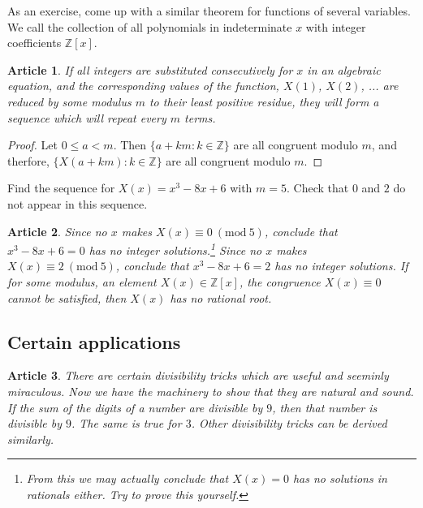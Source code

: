 \documentclass{article}
\theoremstyle{problemstyle}
\newtheorem{article}{Article}
\newcommand{\Mod}[1]{\ (\mathrm{mod}\ #1)}
\begin{document}
As an exercise, come up with a similar theorem for functions of several variables. \\

We call the collection of all polynomials in indeterminate $x$ with integer coefficients $\mathbb{Z}[x]$. 

\begin{article}
If all integers are substituted consecutively for $x$ in an algebraic equation, and the corresponding values of the function, $X(1)$, $X(2)$, ... are reduced by some modulus $m$ to their least positive residue, they will form a sequence which will repeat every $m$ terms.  
\end{article}

\begin{proof}
Let $0 \leq a < m$. Then $\{a+km:k \in \mathbb{Z}\}$ are all congruent modulo $m$, and therfore, $\{X(a+km):k \in \mathbb{Z}\}$ are all congruent modulo $m$. 
\end{proof}

Find the sequence for $X(x) = x^3 - 8x + 6$ with $m = 5$. Check that $0$ and $2$ do not appear in this sequence. 

\begin{article}
Since no $x$ makes $X(x) \equiv 0\Mod{5}$, conclude that $x^3 - 8x + 6 = 0$ has no integer solutions.\footnote{From this we may actually conclude that $X(x) = 0$ has no solutions in rationals either. Try to prove this yourself. }   Since no $x$ makes $X(x) \equiv 2\Mod{5}$, conclude that $x^3 - 8x + 6 = 2$ has no integer solutions. If for some modulus, an element $X(x) \in \mathbb{Z}[x]$, the congruence $X(x) \equiv 0$ cannot be satisfied, then $X(x)$ has no rational root. 
\end{article}

\subsection{Certain applications}

\begin{article}
There are certain divisibility tricks which are useful and seeminly miraculous. Now we have the machinery to show that they are natural and sound.\\

If the sum of the digits of a number are divisible by $9$, then that number is divisible by $9$. The same is true for $3$. Other divisibility tricks can be derived similarly.
\end{article}
\end{document}
